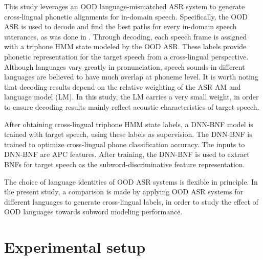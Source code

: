 \documentclass[a4paper]{article}
\begin{document}
This study leverages an OOD language-mismatched ASR system to generate cross-lingual phonetic alignments for in-domain speech.
Specifically, the OOD ASR is used to decode  and find the best paths for every in-domain speech utterances, as was done in \cite{feng2019_TASLP}. Through decoding, each speech frame is assigned with a triphone HMM state modeled by the OOD ASR. These labels provide phonetic representation for the target speech from a cross-lingual perspective. Although languages vary greatly in pronunciation, speech sounds in different languages are believed to have much overlap at phoneme level.
It is worth noting that decoding results depend on the relative weighting  of the ASR AM and language model (LM). In this study, the LM carries a very small weight, in order to ensure decoding results mainly reflect acoustic characteristics of target speech.

After obtaining cross-lingual triphone HMM state labels, a DNN-BNF model is trained with target speech, using these labels as supervision.  
The DNN-BNF is trained to optimize cross-lingual phone classification accuracy.
The inputs to DNN-BNF are APC features. 
After training, the DNN-BNF is used to extract BNFs for target speech as the subword-discriminative feature representation. 

The choice of language identities of OOD ASR systems is flexible in principle. In the present study, a comparison is made by applying OOD ASR systems for different languages to generate cross-lingual labels, in order to study the effect  of OOD  languages towards subword modeling performance.


\section{Experimental setup}
\end{document}

